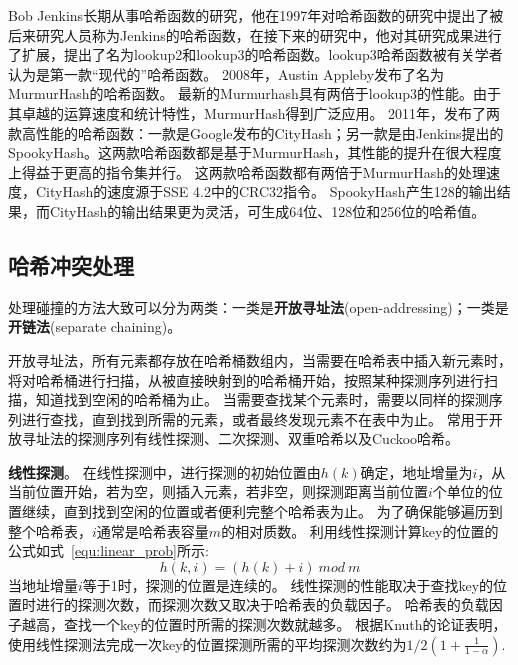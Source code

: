 Bob Jenkins长期从事哈希函数的研究，他在1997年对哈希函数的研究中提出了被后来研究人员称为Jenkins的哈希函数\cite{jenkins1997hash}，在接下来的研究中，他对其研究成果进行了扩展，提出了名为lookup2和lookup3的哈希函数\cite{jenkins2006function}。lookup3哈希函数被有关学者认为是第一款“现代的”哈希函数。
2008年，Austin Appleby发布了名为MurmurHash的哈希函数\cite{Murmurhash}。
最新的Murmurhash具有两倍于lookup3的性能。由于其卓越的运算速度和统计特性，MurmurHash得到广泛应用。
2011年，发布了两款高性能的哈希函数：一款是Google发布的CityHash\cite{cityhash}；另一款是由Jenkins提出的SpookyHash\cite{jenkins2012spookyhash}。这两款哈希函数都是基于MurmurHash，其性能的提升在很大程度上得益于更高的指令集并行。
这两款哈希函数都有两倍于MurmurHash的处理速度，CityHash的速度源于SSE 4.2中的CRC32指令。
SpookyHash产生128的输出结果，而CityHash的输出结果更为灵活，可生成64位、128位和256位的哈希值。

\subsection{哈希冲突处理}

处理碰撞的方法大致可以分为两类：一类是\textbf{开放寻址法}(open-addressing)；一类是\textbf{开链法}(separate chaining)。

开放寻址法，所有元素都存放在哈希桶数组内，当需要在哈希表中插入新元素时，将对哈希桶进行扫描，从被直接映射到的哈希桶开始，按照某种探测序列进行扫描，知道找到空闲的哈希桶为止。
当需要查找某个元素时，需要以同样的探测序列进行查找，直到找到所需的元素，或者最终发现元素不在表中为止。
常用于开放寻址法的探测序列有线性探测、二次探测、双重哈希以及Cuckoo哈希。

\textbf{线性探测}。
在线性探测中，进行探测的初始位置由$h(k)$确定，地址增量为$i$，从当前位置开始，若为空，则插入元素，若非空，则探测距离当前位置$i$个单位的位置继续，直到找到空闲的位置或者便利完整个哈希表为止。
为了确保能够遍历到整个哈希表，$i$通常是哈希表容量$m$的相对质数。
利用线性探测计算key的位置的公式如式~\ref{equ:linear_prob}所示:
\begin{equation}
	h(k,i) = (h(k)+i) ~{mod}~m
\label{equ:linear_prob}
\end{equation}
当地址增量$i$等于1时，探测的位置是连续的。
线性探测的性能取决于查找key的位置时进行的探测次数，而探测次数又取决于哈希表的负载因子。
哈希表的负载因子越高，查找一个key的位置时所需的探测次数就越多。
根据Knuth的论证表明\cite{knuth1998art}，使用线性探测法完成一次key的位置探测所需的平均探测次数约为$1/2(1+\frac{1}{1-\alpha})$.


